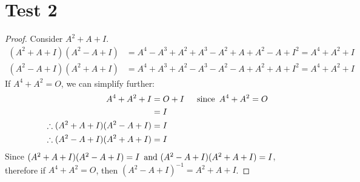 \documentclass{article}
\newcommand{\assignment}{Test 2}
\begin{document}
\section*{\assignment}

\begin{proof}
  Consider $A^2 + A + I$.
  \begin{align*}
    (A^2 + A + I)(A^2 - A + I) & = A^4 - A^3 + A^2 + A^3 - A^2 + A + A^2 - A + I^2 = A^4 + A^2 + I \\
    (A^2 - A + I)(A^2 + A + I) & = A^4 + A^3 + A^2 - A^3 - A^2 - A + A^2 + A + I^2 = A^4 + A^2 + I
  \end{align*}
  If $A^4 + A^2 = O$, we can simplify further:
  \begin{align*}
    A^4 + A^2 + I                         & = O + I &  & \operatorname{~\text{since}~} A^4 + A^2 = O \\
                                          & = I                                \\
    \therefore (A^2 + A + I)(A^2 - A + I) & = I                                \\
    \therefore (A^2 - A + I)(A^2 + A + I) & = I
  \end{align*}
  Since $(A^2 + A + I)(A^2 - A + I) = I \operatorname{~\text{and}~} (A^2 - A + I)(A^2 + A + I) = I$, therefore if $A^4 + A^2 = O$, then $(A^2 - A + I)^{-1} = A^2 + A + I$.
\end{proof}
\qdash
\end{document}
